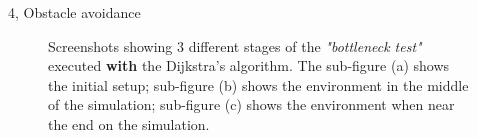 \documentclass[10pt,a4paper]{article}
\begin{document}
\begin{task}{4, Obstacle avoidance}
\begin{figure}[H]
    \centering
    \hfill
    \hfill
    \caption{Screenshots showing 3 different stages of the \textit{"bottleneck test"} executed \textbf{with} the Dijkstra's algorithm. The sub-figure (a) shows the initial setup; sub-figure (b) shows the environment in the middle of the simulation; sub-figure (c) shows the environment when near the end on the simulation.}
    \label{fig:bottleneck-dijkstra}
\end{figure}

\end{task}
\end{document}
